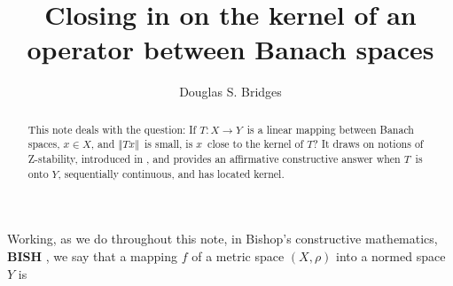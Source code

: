 \documentclass[11pt]{article}%
\begin{document}
\title{\textsf{Closing in on the kernel of an operator between Banach spaces}}
\author{\textsf{Douglas S. Bridges}}
\maketitle

\begin{abstract}%
\noindent
\textsf{This note deals with the question: If }$T:X\rightarrow Y$\textsf{\ is
a linear mapping between Banach spaces, }$x\in X$\textsf{, and }$\left\Vert
Tx\right\Vert $\textsf{\ is small, is }$x$\textsf{\ close to the kernel of
}$T$\textsf{? It draws on notions of Z-stability, introduced in \cite{BDM2016}%
, and provides an affirmative constructive answer when }$T$\textsf{\ is onto
}$Y$\textsf{, sequentially continuous, and has located kernel.}

\end{abstract}

%

\normalfont\sf
%

\bigskip
%

\bigskip
%

\noindent
Working, as we do throughout this note, in Bishop's constructive mathematics,
\textbf{BISH} \cite{Bishop,BVtech,Handbook}, we say that a mapping $f$ of a
metric space $(X,\rho)$ into a normed space $Y$ is
\end{document}
